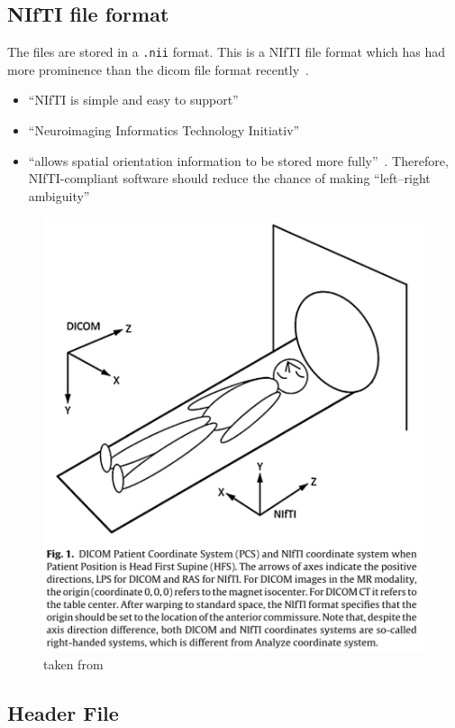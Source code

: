 \documentclass[11pt]{article}
\begin{document}
\subsection{NIfTI file format}

The files are stored in a \texttt{.nii} format. This is a NIfTI file format which has had more prominence than the dicom file format recently~\cite{dicom-to-nifti-conversion}. 

\begin{itemize}
    \item ``NIfTI is simple and easy to support''
    \item ``Neuroimaging Informatics Technology Initiativ''~\cite{file-formats}
    \item ``allows spatial orientation information to be stored more fully''~\cite{dicom-to-nifti-conversion}. Therefore, NIfTI-compliant software should reduce the chance of making ``left–right ambiguity''~\cite{file-formats,dicom-to-nifti-conversion}
\end{itemize}

\begin{figure}[H]
    \centering
    \includegraphics[width=.75\linewidth]{images/dicom-nifti.png}
    \caption{taken from~\cite{dicom-to-nifti-conversion}}
\end{figure}

\subsection{Header File}
\end{document}

